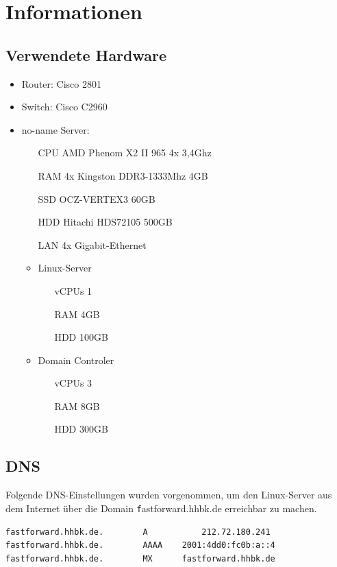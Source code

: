 \section{Informationen}

\subsection{Verwendete Hardware}

\begin{itemize}
	\item Router: Cisco 2801
	\item Switch: Cisco C2960
	\item no-name Server:
		\begin{itemize}
			\item[CPU] AMD Phenom X2 II 965 4x 3,4Ghz
			\item[RAM] 4x Kingston DDR3-1333Mhz 4GB
			\item[SSD] OCZ-VERTEX3 60GB
			\item[HDD] Hitachi HDS72105 500GB
			\item[LAN] 4x Gigabit-Ethernet
			\item Linux-Server
				\begin{itemize}
					\item[vCPUs] 1
					\item[RAM] 4GB
					\item[HDD] 100GB
				\end{itemize}
			\item Domain Controler
				\begin{itemize}
					\item[vCPUs] 3
					\item[RAM] 8GB
					\item[HDD] 300GB
				\end{itemize}
		\end{itemize}
\end{itemize}

\subsection{DNS}

Folgende DNS-Einstellungen wurden vorgenommen, um den Linux-Server aus dem Internet über die Domain {\texttt fastforward.hhbk.de} erreichbar zu machen.
\begin{lstlisting}[numbers=none]
fastforward.hhbk.de.		A			212.72.180.241
fastforward.hhbk.de.		AAAA 	2001:4dd0:fc0b:a::4
fastforward.hhbk.de.		MX		fastforward.hhbk.de
\end{lstlisting}

